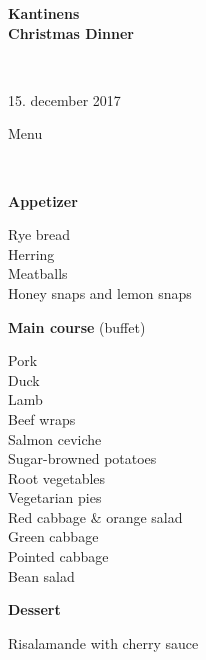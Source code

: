 \begin{center}
\begin{HUGE}
\textbf{Kantinens \\[3mm] Christmas Dinner}
\end{HUGE}
\\[.6cm]
\begin{Large}
15. december 2017
\end{Large}
\end{center}
\vspace*{.01cm}
\begin{center}
\begin{huge}
Menu
\end{huge}
\\[.1cm]
\end{center}
\newcommand{\course}[1]{\vspace*{4mm} \textbf{#1} \vspace{-7mm}}
\newcommand{\goodindent}{\null\hspace{23mm}}
{\small
\begin{center}
\course{Appetizer}
\end{center}
  \goodindent Rye bread
\\\goodindent Herring
\\\goodindent Meatballs
\\\goodindent Honey snaps and lemon snaps

\begin{center}
\course{Main course} (buffet)
\end{center}
  \goodindent Pork
\\\goodindent Duck
\\\goodindent Lamb
\\\goodindent Beef wraps
\\\goodindent Salmon ceviche
\\\goodindent Sugar-browned potatoes
\\\goodindent Root vegetables
\\\goodindent Vegetarian pies
\\\goodindent Red cabbage \& orange salad
\\\goodindent Green cabbage
\\\goodindent Pointed cabbage
\\\goodindent Bean salad

\begin{center}
\course{Dessert}
\end{center}
  \goodindent Risalamande with cherry sauce
}
